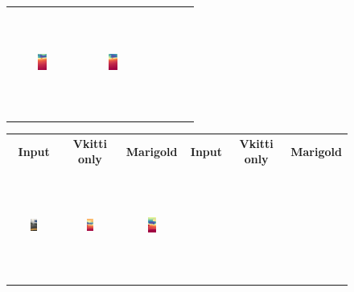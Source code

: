 \documentclass{article}
\begin{document}
\begin{figure}[H]
\begin{tabular}{cccccc}
    \includegraphics[width=0.15\textwidth,height=3.5cm,keepaspectratio]{images/real_image_trained/depth_colored/2.png} &
    \includegraphics[width=0.15\textwidth,height=3.5cm,keepaspectratio]{images/real_image/depth_colored/2.png} \\
  \end{tabular}
  \begin{tabular}{cccccc}
    \textbf{Input} & \textbf{Vkitti only} & \textbf{Marigold} & \textbf{Input} & \textbf{Vkitti only} & \textbf{Marigold} \\
    \includegraphics[width=0.15\textwidth,height=3.5cm,keepaspectratio]{images/on-the-road/3.jpg} &
    \includegraphics[width=0.15\textwidth,height=3.5cm,keepaspectratio]{images/real_image_trained/depth_colored/3.png} &
    \includegraphics[width=0.15\textwidth,height=3.5cm,keepaspectratio]{images/real_image/depth_colored/3.png} &

\end{tabular}
\end{figure}
\end{document}
